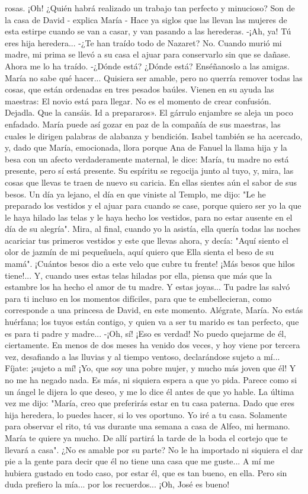 \documentclass[12pt]{book} %
\begin{document}
rosas. ¡Oh! ¿Quién habrá realizado un trabajo tan perfecto y minucioso? 
Son de la casa de David - explica María - Hace ya siglos que las llevan las mujeres de esta estirpe cuando se van a casar, 
y van pasando a las herederas. 
-¡Ah, ya! Tú eres hija heredera... 
-¿Te han traído todo de Nazaret? 
No. Cuando murió mi madre, mi prima se llevó a su casa el ajuar para conservarlo sin que se dañase. Ahora me lo ha 
traído. 
-¿Dónde está? ¿Dónde está? Enséñanoslo a las amigas. 
María no sabe qué hacer... Quisiera ser amable, pero no querría remover todas las cosas, que están ordenadas en tres pesados baúles. 
Vienen en su ayuda las maestras: 
El novio está para llegar. No es el momento de crear confusión. Dejadla. Que la cansáis. Id a prepararos». 
El gárrulo enjambre se aleja un poco enfadado. María puede así gozar en paz de la compañía de sus maestras, las cuales 
le dirigen palabras de alabanza y bendición. 
Isabel también se ha acercado, y, dado que María, emocionada, llora porque Ana de Fanuel la llama hija y la besa con 
un afecto verdaderamente maternal, le dice: 
María, tu madre no está presente, pero sí está presente. Su espíritu se regocija junto al tuyo, y, mira, las cosas que 
llevas te traen de nuevo su caricia. En ellas sientes aún el sabor de sus besos. Un día ya lejano, el día en que viniste al Templo, me dijo: "Le he preparado los vestidos y el ajuar para cuando se case, porque quiero ser yo la que le haya hilado las telas y le haya hecho los vestidos, para no estar ausente en el día de su alegría". Mira, al final, cuando yo la asistía, ella quería todas las noches acariciar tus primeros vestidos y este que llevas ahora, y decía: "Aquí siento el olor de jazmín de mi pequeñuela, aquí quiero que Ella sienta el beso de su mamá". ¡Cuántos besos dio a este velo que cubre tu frente! ¡Más besos que hilos tiene!... Y, cuando uses estas telas hiladas por ella, piensa que más que la estambre los ha hecho el amor de tu madre. Y estas joyas... Tu padre las salvó para ti incluso en los momentos difíciles, para que te embellecieran, como corresponde a una princesa de David, en este momento. Alégrate, María. No estás huérfana; los tuyos están contigo, y quien va a ser tu marido es tan perfecto, que es para ti padre y madre... 
-¡Oh, sí! ¡Eso es verdad! No puedo quejarme de él, ciertamente. En menos de dos meses ha venido dos veces, y hoy 
viene por tercera vez, desafiando a las lluvias y al tiempo ventoso, declarándose sujeto a mí... Fíjate: ¡sujeto a mí! ¡Yo, que soy una pobre mujer, y mucho más joven que él! Y no me ha negado nada. Es más, ni siquiera espera a que yo pida. Parece como si un ángel le dijera lo que deseo, y me lo dice él antes de que yo hable. La última vez me dijo: "María, creo que preferirás estar en tu casa paterna. Dado que eres hija heredera, lo puedes hacer, si lo ves oportuno. Yo iré a tu casa. Solamente para observar el rito, tú vas durante una semana a casa de Alfeo, mi hermano. María te quiere ya mucho. De allí partirá la tarde de la boda el cortejo que te llevará a casa". ¿No es amable por su parte? No le ha importado ni siquiera el dar pie a la gente para decir que él no tiene una casa que me guste... A mí me hubiera gustado en todo caso, por estar él, que es tan bueno, en ella. Pero sin duda prefiero la mía... por los recuerdos... ¡Oh, José es bueno! 
\end{document}
